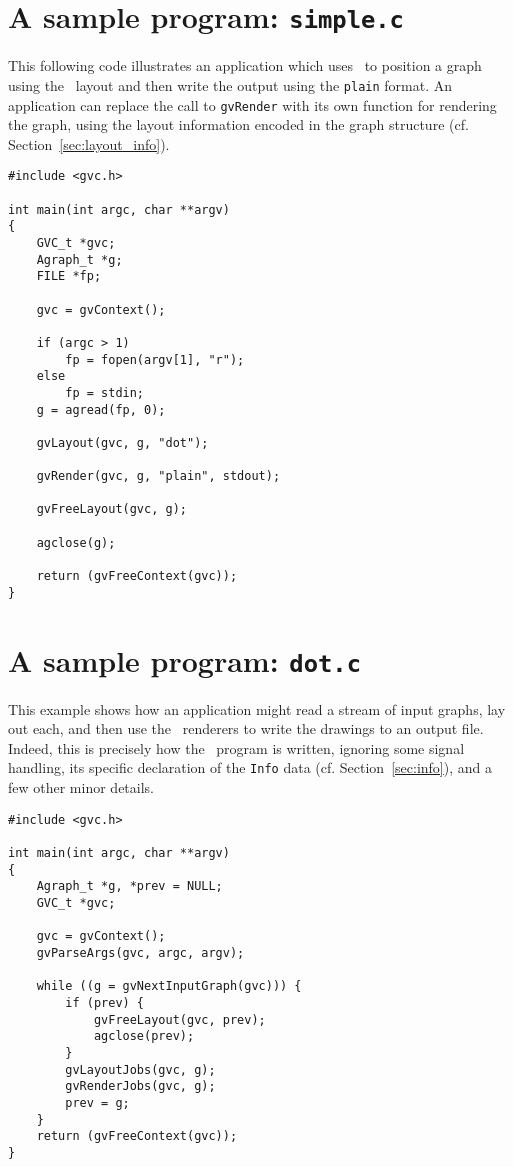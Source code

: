 \section{A sample program: {\tt simple.c}}
\label{sec:simple}
This following code illustrates an application which uses \gviz\ to
position a graph using the \dot\ layout and then write the output
using the {\tt plain} format.
An application can replace the call to {\tt gvRender} with its own
function for rendering the graph, using the layout information
encoded in the graph structure (cf. Section~\ref{sec:layout_info}).
\begin{verbatim}
#include <gvc.h>

int main(int argc, char **argv)
{
    GVC_t *gvc; 
    Agraph_t *g;
    FILE *fp;

    gvc = gvContext();

    if (argc > 1)
        fp = fopen(argv[1], "r");
    else    
        fp = stdin;
    g = agread(fp, 0);

    gvLayout(gvc, g, "dot");

    gvRender(gvc, g, "plain", stdout);

    gvFreeLayout(gvc, g);

    agclose(g);

    return (gvFreeContext(gvc));
}
\end{verbatim}
\newpage

\section{A sample program: {\tt dot.c}}
\label{sec:dot}
This example shows how an application might read a stream of input graphs,
lay out each, and then use the \gviz\ renderers to write the drawings
to an output file. Indeed, this
is precisely how the \dot\ program is written, ignoring some signal
handling, its specific declaration of 
the {\tt Info} data (cf. Section~\ref{sec:info}), and a few other
minor details.
\begin{verbatim}
#include <gvc.h>
    
int main(int argc, char **argv)
{   
    Agraph_t *g, *prev = NULL;
    GVC_t *gvc;

    gvc = gvContext();
    gvParseArgs(gvc, argc, argv);
    
    while ((g = gvNextInputGraph(gvc))) {
        if (prev) {
            gvFreeLayout(gvc, prev);
            agclose(prev);
        }
        gvLayoutJobs(gvc, g); 
        gvRenderJobs(gvc, g);
        prev = g;
    }
    return (gvFreeContext(gvc));
}

\end{verbatim}
\newpage

